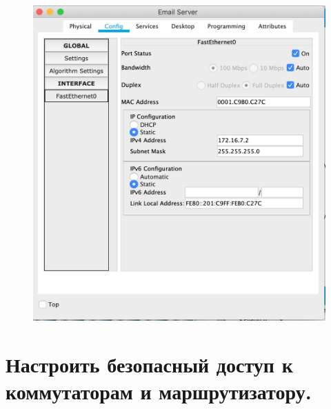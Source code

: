 \documentclass[a4paper,12pt]{article}
\begin{document}
\begin{figure}[h!]
\begin{minipage}[b]{0.32\textwidth}
		\end{minipage}
		\begin{minipage}[b]{0.32\textwidth}
			\includegraphics[width=\textwidth]{2.3.png}
		\end{minipage}
		\label{ris:2}
	\end{figure}

	\newpage
	
	\section{Настроить безопасный доступ к коммутаторам и маршрутизатору.}
	
\end{document}
